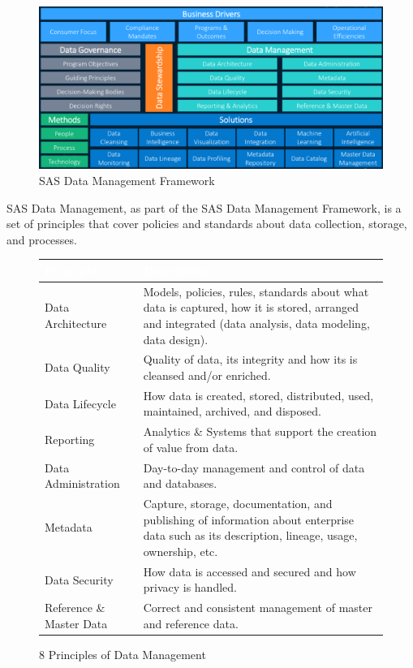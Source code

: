 \begin{figure}[H]
    \centering
    \includegraphics[scale=0.55]{images/SAS Data Management Framework.png}
    \caption{SAS Data Management Framework}
    \label{SAS DMF}
\end{figure}

SAS Data Management, as part of the SAS Data Management Framework, is a set of principles that cover policies and standards about data collection, storage, and processes. 

\begin{figure}[H]
\begin{center}
    \renewcommand{\arraystretch}{1.5}
    \begin{tabular}{|>{\raggedright\arraybackslash}m{3.5cm}
                    |>{\raggedright\arraybackslash}m{11.5cm}
                    |}
    \hline
    \rowcolor[HTML]{196fb4}\centering\textcolor{white}{\large Principle} 
                            & \centering\textcolor{white}{\large Description} 
                            \tabularnewline 
    \hline
    Data Architecture & Models, policies, rules, standards about what data is captured, how it is stored, arranged and integrated (data analysis, data modeling, data design). \\\hline
    Data Quality & Quality of data, its integrity and how its is cleansed and/or enriched. \\\hline
    Data Lifecycle & How data is created, stored, distributed, used, maintained, archived, and disposed. \\\hline
    Reporting & Analytics \& Systems that support the creation of value from data. \\\hline
    Data Administration & Day-to-day management and control of data and databases. \\\hline
    Metadata & Capture, storage, documentation, and publishing of information about enterprise data such as its description, lineage, usage, ownership, etc. \\\hline
    Data Security & How data is accessed and secured and how privacy is handled. \\\hline
    Reference \& Master Data & Correct and consistent management of master and reference data. \\\hline
    \end{tabular}
\end{center}
\caption{8 Principles of Data Management}
\label{8 DMA Principles}
\end{figure}

